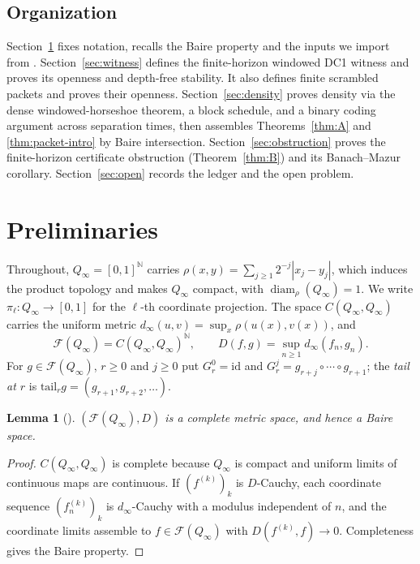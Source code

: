 \documentclass[11pt]{article}
\newtheorem{lemma}[theorem]{Lemma}
\newcommand{\Q}{Q_\infty}
\newcommand{\F}{\mathcal{F}}
\newcommand{\diam}{\operatorname{diam}}
\begin{document}
\subsection*{Organization}

Section~\ref{sec:prelim} fixes notation, recalls the Baire property and the inputs we
import from \cite{Shmalo2026,companion}.  Section~\ref{sec:witness} defines the
finite-horizon windowed DC1 witness and proves its openness and depth-free stability.
It also defines finite scrambled packets and proves their openness.  Section~\ref{sec:density}
proves density via the dense windowed-horseshoe theorem, a block schedule, and a binary
coding argument across separation times, then assembles Theorems~\ref{thm:A} and
\ref{thm:packet-intro} by Baire intersection.
Section~\ref{sec:obstruction} proves the finite-horizon certificate obstruction
(Theorem~\ref{thm:B}) and its Banach--Mazur corollary.  Section~\ref{sec:open} records
the ledger and the open problem.

\section{Preliminaries}\label{sec:prelim}

Throughout, $\Q=[0,1]^{\mathbb N}$ carries
$\rho(x,y)=\sum_{j\ge1}2^{-j}|x_j-y_j|$, which induces the product topology and makes
$\Q$ compact, with $\diam_\rho(\Q)=1$.  We write $\pi_\ell:\Q\to[0,1]$ for the $\ell$-th
coordinate projection.  The space $C(\Q,\Q)$ carries the uniform metric
$d_\infty(u,v)=\sup_x\rho(u(x),v(x))$, and
\[
\F(\Q)=C(\Q,\Q)^{\mathbb N},\qquad
D(f,g)=\sup_{n\ge1}d_\infty(f_n,g_n).
\]
For $g\in\F(\Q)$, $r\ge0$ and $j\ge0$ put $G^0_r=\mathrm{id}$ and
$G^j_r=g_{r+j}\circ\cdots\circ g_{r+1}$; the \emph{tail at $r$} is
$\mathrm{tail}_rg=(g_{r+1},g_{r+2},\dots)$.

\begin{lemma}[{\cite[Lemma~2.1]{Shmalo2026}}]\label{lem:baire}
$(\F(\Q),D)$ is a complete metric space, and hence a Baire space.
\end{lemma}

\begin{proof}
$C(\Q,\Q)$ is complete because $\Q$ is compact and uniform limits of continuous maps
are continuous.  If $(f^{(k)})_k$ is $D$-Cauchy, each coordinate sequence
$(f^{(k)}_n)_k$ is $d_\infty$-Cauchy with a modulus independent of $n$, and the
coordinate limits assemble to $f\in\F(\Q)$ with $D(f^{(k)},f)\to0$.  Completeness gives
the Baire property.
\end{proof}
\end{document}
